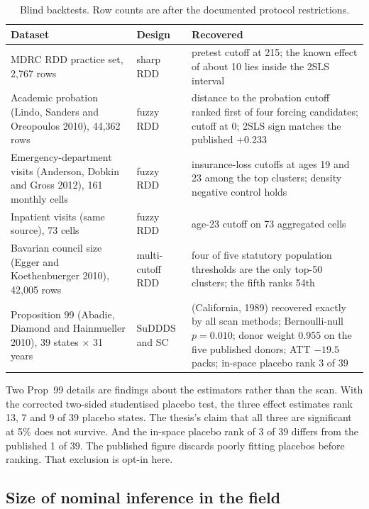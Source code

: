 \documentclass[11pt]{article}
\begin{document}
\begin{table}[t]
\centering
\small
\caption{Blind backtests. Row counts are after the documented protocol restrictions.}
\label{tab:backtests}
\begin{tabular}{@{}p{3.3cm}p{1.9cm}p{9.4cm}@{}}
\toprule
Dataset & Design & Recovered \\
\midrule
MDRC RDD practice set, 2{,}767 rows & sharp RDD & pretest cutoff at 215; the known effect of about 10 lies inside the 2SLS interval \\
Academic probation (Lindo, Sanders and Oreopoulos 2010), 44{,}362 rows & fuzzy RDD & distance to the probation cutoff ranked first of four forcing candidates; cutoff at 0; 2SLS sign matches the published +0.233 \\
Emergency-department visits (Anderson, Dobkin and Gross 2012), 161 monthly cells & fuzzy RDD & insurance-loss cutoffs at ages 19 and 23 among the top clusters; density negative control holds \\
Inpatient visits (same source), 73 cells & fuzzy RDD & age-23 cutoff on 73 aggregated cells \\
Bavarian council size (Egger and Koethenbuerger 2010), 42{,}005 rows & multi-cutoff RDD & four of five statutory population thresholds are the only top-50 clusters; the fifth ranks 54th \\
Proposition 99 (Abadie, Diamond and Hainmueller 2010), 39 states $\times$ 31 years & SuDDDS and SC & (California, 1989) recovered exactly by all scan methods; Bernoulli-null $p = 0.010$; donor weight 0.955 on the five published donors; ATT $-19.5$ packs; in-space placebo rank 3 of 39 \\
\bottomrule
\end{tabular}
\end{table}

Two Prop~99 details are findings about the estimators rather than the scan. With the corrected two-sided studentised placebo test, the three effect estimates rank 13,
7 and 9 of 39 placebo states. The thesis's claim that all three are significant at 5\%
does not survive. And the in-space placebo rank of 3 of 39 differs from the published 1 of
39. The published figure discards poorly fitting placebos before ranking. That exclusion
is opt-in here.

\subsection{Size of nominal inference in the field}\label{sec:field}
\end{document}
